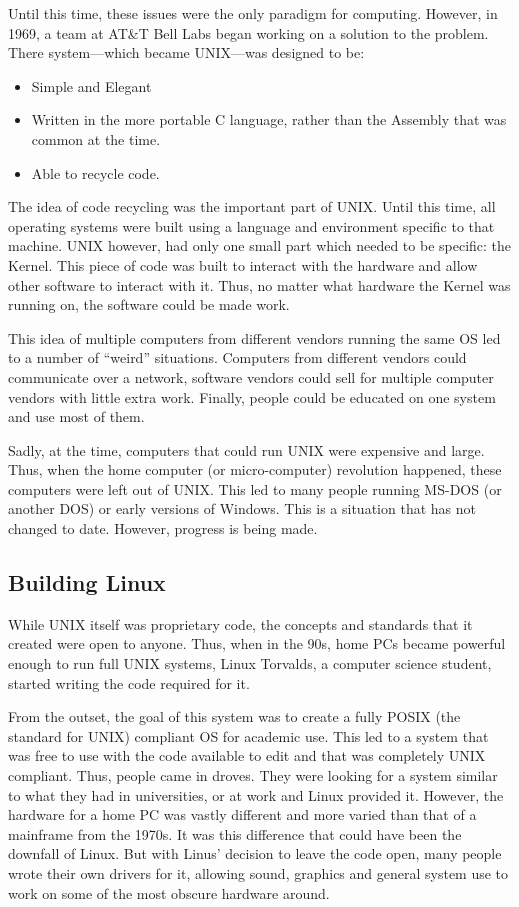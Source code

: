 				Until this time, these issues were the only paradigm for computing.
				However, in 1969, a team at AT\&T Bell Labs began working on a solution to the problem.
				There system---which became UNIX---was designed to be:
				\begin{itemize}
					\item Simple and Elegant
					\item Written in the more portable C language, rather than the Assembly that was common at the time.
					\item Able to recycle code.
				\end{itemize}
				The idea of code recycling was the important part of UNIX.
				Until this time, all operating systems were built using a language and environment specific to that machine.
				UNIX however, had only one small part which needed to be specific: the Kernel.
				This piece of code was built to interact with the hardware and allow other software to interact with it.
				Thus, no matter what hardware the Kernel was running on, the software could be made work.

				This idea of multiple computers from different vendors running the same OS led to a number of ``weird'' situations.
				Computers from different vendors could communicate over a network,
				software vendors could sell for multiple computer vendors with little extra work.
				Finally, people could be educated on one system and use most of them.

				Sadly, at the time, computers that could run UNIX were expensive and large.
				Thus, when the home computer (or micro-computer) revolution happened, these computers were left out of UNIX.
				This led to many people running MS-DOS (or another DOS) or early versions of Windows.
				This is a situation that has not changed to date.
				However, progress is being made.

			\subsection{Building Linux}
				While UNIX itself was proprietary code, the concepts and standards that it created were open to anyone.
				Thus, when in the 90s, home PCs became powerful enough to run full UNIX systems,
				Linux Torvalds, a computer science student, started writing the code required for it.

				From the outset, the goal of this system was to create a fully POSIX (the standard for UNIX) compliant OS for academic use.
				This led to a system that was free to use with the code available to edit and that was completely UNIX compliant.
				Thus, people came in droves.
				They were looking for a system similar to what they had in universities, or at work and Linux provided it.
				However, the hardware for a home PC was vastly different and more varied than that of a mainframe from the 1970s.
				It was this difference that could have been the downfall of Linux.
				But with Linus' decision to leave the code open, many people wrote their own drivers for it, allowing sound, graphics and general system use to work on some of the most obscure hardware around.

